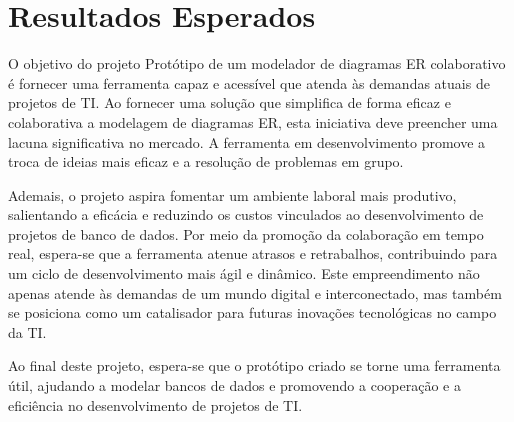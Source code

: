 \chapter{Resultados Esperados}

O objetivo do projeto Protótipo de um modelador de diagramas ER colaborativo é fornecer uma ferramenta capaz e acessível que atenda às demandas atuais de projetos de TI. Ao fornecer uma solução que simplifica de forma eficaz e colaborativa a modelagem de diagramas ER, esta iniciativa deve preencher uma lacuna significativa no mercado. A ferramenta em desenvolvimento promove a troca de ideias mais eficaz e a resolução de problemas em grupo.

Ademais, o projeto aspira fomentar um ambiente laboral mais produtivo, salientando a eficácia e reduzindo os custos vinculados ao desenvolvimento de projetos de banco de dados. Por meio da promoção da colaboração em tempo real, espera-se que a ferramenta atenue atrasos e retrabalhos, contribuindo para um ciclo de desenvolvimento mais ágil e dinâmico. Este empreendimento não apenas atende às demandas de um mundo digital e interconectado, mas também se posiciona como um catalisador para futuras inovações tecnológicas no campo da TI.

Ao final deste projeto, espera-se que o protótipo criado se torne uma ferramenta útil, ajudando a modelar bancos de dados e promovendo a cooperação e a eficiência no desenvolvimento de projetos de TI.